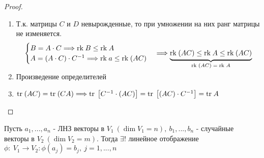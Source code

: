     \begin{proof} \tab 
        \begin{enumerate}
            \item Т.к. матрицы $C$ и $D$ невырожденные, то при умножении на них ранг матрицы не изменяется.
            $$\begin{cases}
                B = A \cdot C \Longrightarrow \text{rk} \hspace{0.09cm} B \leq \text{rk} \hspace{0.09cm} A\\
                A = (A \cdot C) \cdot C^{-1} \Longrightarrow \text{rk} \hspace{0.09cm} a \leq \text{rk} \hspace{0.09cm} (AC)
            \end{cases} \Longrightarrow \undermat{\text{rk} \hspace{0.09cm} (AC) = \text{rk} \hspace{0.09cm} A}{\text{rk} \hspace{0.09cm} (AC)\leq \text{rk} \hspace{0.09cm} A \leq \text{rk} \hspace{0.09cm} (AC)}$$
            \item Произведение определителей
            \item $\text{tr} \hspace{0.09cm} (AC) = \text{tr} \hspace{0.09cm}(CA) \Longrightarrow \text{tr} \hspace{0.09cm}\left[C^{-1} \cdot (AC)\right] = \text{tr} \hspace{0.09cm}\left[(AC)\cdot C^{-1}\right] = \text{tr} \hspace{0.09cm}A$    
        \end{enumerate}
    \end{proof}  
    \begin{theorem}
        Пусть $a_1,...,a_n$ - ЛНЗ векторы в $V_1 \ (\dim V_1 = n), \ b_1,...,b_n$ - случайные векторы в $V_2\ (\dim V_2 = m)$. Тогда $\exists !$ линейное отображение $\phi: \ V_1 \to V_2: \phi(a_j) = b_j, \ j = 1,...,n$     
    \end{theorem}
